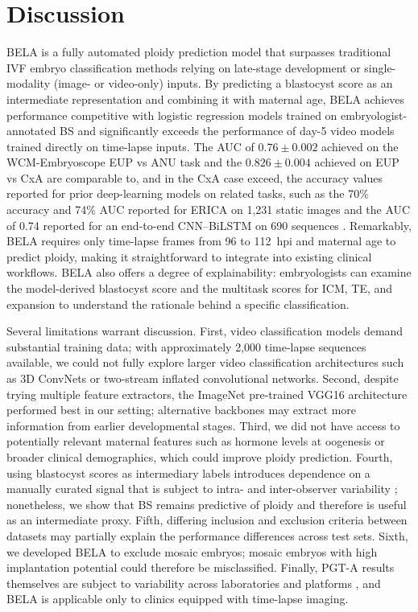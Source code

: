 \documentclass[10pt]{article}
\begin{document}
\section{Discussion}
BELA is a fully automated ploidy prediction model that surpasses traditional
IVF embryo classification methods relying on late-stage development or
single-modality (image- or video-only) inputs. By predicting a blastocyst
score as an intermediate representation and combining it with maternal age,
BELA achieves performance competitive with logistic regression models trained
on embryologist-annotated BS and significantly exceeds the performance of
day-5 video models trained directly on time-lapse inputs. The AUC of
$0.76 \pm 0.002$ achieved on the WCM-Embryoscope EUP vs ANU task and the
$0.826 \pm 0.004$ achieved on EUP vs CxA are comparable to, and in the CxA
case exceed, the accuracy values reported for prior deep-learning models on
related tasks, such as the 70\% accuracy and 74\% AUC reported for ERICA on
1{,}231 static images \citep{chavezbadiola2020erica} and the AUC of 0.74
reported for an end-to-end CNN--BiLSTM on 690 sequences
\citep{lee2021endtoend}. Remarkably, BELA
requires only time-lapse frames from 96 to 112~hpi and maternal age to
predict ploidy, making it straightforward to integrate into existing clinical
workflows. BELA also offers a degree of explainability: embryologists can
examine the model-derived blastocyst score and the multitask scores for ICM,
TE, and expansion to understand the rationale behind a specific classification.

Several limitations warrant discussion. First, video classification models
demand substantial training data; with approximately 2{,}000 time-lapse
sequences available, we could not fully explore larger video classification
architectures such as 3D ConvNets or two-stream inflated convolutional
networks. Second, despite trying multiple feature extractors, the ImageNet
pre-trained VGG16 architecture performed best in our setting; alternative
backbones may extract more information from earlier developmental stages.
Third, we did not have access to potentially relevant maternal features such
as hormone levels at oogenesis or broader clinical demographics, which could
improve ploidy prediction. Fourth, using blastocyst scores as intermediary
labels introduces dependence on a manually curated signal that is subject to
intra- and inter-observer variability
\citep{paternot2009intra,paternot2011multicentre,hammond2020freeze,richardson2015grading};
nonetheless, we show that BS remains predictive of ploidy and therefore is
useful as an intermediate proxy. Fifth, differing inclusion and exclusion
criteria between datasets may partially explain the performance differences
across test sets. Sixth, we developed BELA to exclude mosaic embryos; mosaic
embryos with high implantation potential could therefore be misclassified.
Finally, PGT-A results themselves are subject to variability across
laboratories and platforms \citep{maxwell2016miscarriage,friedenthal2020ngs},
and BELA is applicable only to clinics equipped with time-lapse imaging.
\end{document}
